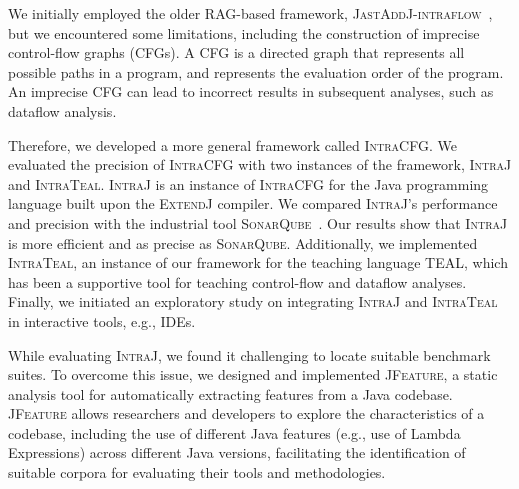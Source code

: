 
We initially employed the older RAG-based framework, \textsc{JastAddJ-intraflow}~\cite{10.1016/j.scico.2012.02.002},
but we encountered some limitations, including the construction of imprecise control-flow graphs (CFGs).
A CFG is a directed graph that represents all possible paths in a program, and
represents the evaluation order of the program. An imprecise CFG can lead to
incorrect results in subsequent analyses, such as dataflow analysis.

Therefore, we developed a more general framework called \textsc{IntraCFG}.
We evaluated the precision of \textsc{IntraCFG} with two instances of the framework,
\textsc{IntraJ} and \textsc{IntraTeal}.
\textsc{IntraJ} is an instance of \textsc{IntraCFG} for the Java programming language
built upon the \textsc{ExtendJ} compiler. We compared \textsc{IntraJ}'s performance and precision with the industrial tool \textsc{SonarQube}~\cite{sonarqube}. Our results
show that \textsc{IntraJ} is more efficient and as precise as \textsc{SonarQube}.
Additionally, we implemented \textsc{IntraTeal}, an instance of our framework for the teaching
language TEAL, which has been a supportive tool for teaching control-flow and
dataflow analyses. Finally, we initiated an exploratory study on integrating
\textsc{IntraJ} and \textsc{IntraTeal} in interactive tools, e.g., IDEs.

While evaluating \textsc{IntraJ}, we found it challenging to locate suitable
benchmark suites. To overcome this issue, we designed and implemented \textsc{JFeature},
a static analysis tool for automatically extracting features from a Java codebase.
\textsc{JFeature} allows researchers and developers to explore the characteristics of a
codebase, including the use of different Java features (e.g., use of Lambda Expressions)  across different
Java versions, facilitating the identification of suitable corpora for evaluating
their tools and methodologies.

